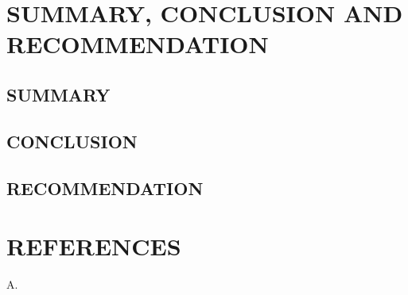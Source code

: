 \documentclass[12pt]{report}
\begin{document}
	
	
	
	
	\chapter{SUMMARY, CONCLUSION AND RECOMMENDATION}
	\section{SUMMARY}

	
	\section{CONCLUSION} 

	
	\section{RECOMMENDATION}

	

		\chapter*{REFERENCES}
	\begin{description}
		\item A.
	\end{description}
\end{document}
